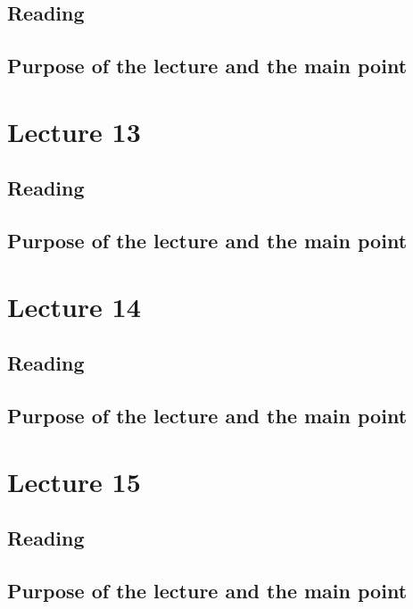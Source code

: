 \subsection{Reading}


\subsection{Purpose of the lecture and the main point}


\section{Lecture 13}


\subsection{Reading}


\subsection{Purpose of the lecture and the main point}

\section{Lecture 14}


\subsection{Reading}


\subsection{Purpose of the lecture and the main point}



\section{Lecture 15}

\subsection{Reading}


\subsection{Purpose of the lecture and the main point}


